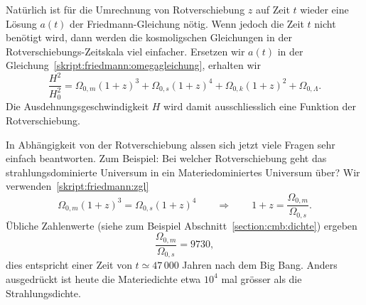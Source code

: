 Natürlich ist für die Umrechnung von Rotverschiebung $z$ auf Zeit $t$
wieder eine Lösung $a(t)$ der Friedmann-Gleichung nötig.
Wenn jedoch die Zeit $t$ nicht benötigt wird, dann werden die
kosmoligschen Gleichungen in der Rotverschiebungs-Zeitskala
viel einfacher.
Ersetzen wir $a(t)$ in der Gleichung~\eqref{skript:friedmann:omegagleichung},
erhalten wir
\begin{equation}
\frac{H^2}{H_0^2}
=
\Omega_{0,m}(1+z)^3
+
\Omega_{0,s}(1+z)^4
+
\Omega_{0,k}(1+z)^2
+
\Omega_{0,\Lambda}.
\label{skript:friedmann:zgl}
\end{equation}
Die Ausdehnungsgeschwindigkeit $H$ wird damit ausschliesslich eine
Funktion der Rotverschiebung.

In Abhängigkeit von der Rotverschiebung alssen sich jetzt viele Fragen
sehr einfach beantworten.
Zum Beispiel: Bei welcher Rotverschiebung geht das strahlungsdominierte
Universum in ein Materiedominiertes Universum über?
Wir verwenden~\eqref{skript:friedmann:zgl}
\[
\Omega_{0,m}(1+z)^3 = \Omega_{0,s}(1+z)^4
\qquad\Rightarrow\qquad
1+z
=
\frac{\Omega_{0,m}}{\Omega_{0,s}}.
\]
Übliche Zahlenwerte (siehe zum Beispiel Abschnitt~\ref{section:cmb:dichte})
ergeben
\begin{equation}
\frac{\Omega_{0,m}}{\Omega_{0,s}} = 9730,
\label{skript:friedmann:msequal}
\end{equation}
dies entspricht einer Zeit von $t\simeq 47\,000$ Jahren nach dem Big Bang.
Anders ausgedrückt ist heute die Materiedichte etwa $10^4$ mal grösser
als die Strahlungsdichte.



